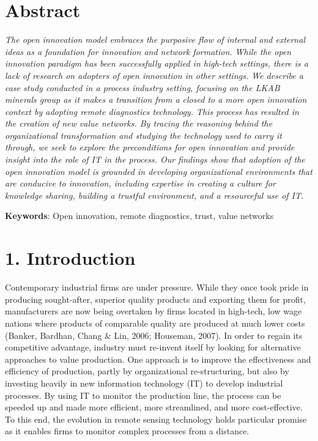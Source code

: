 \documentclass[]{article}
\begin{document}
\section*{\centering Abstract}

\emph{The open innovation model embraces the purposive flow of internal
and external ideas as a foundation for innovation and network formation.
While the open innovation paradigm has been successfully applied in
high-tech settings, there is a lack of research on adopters of open
innovation in other settings. We describe a case study conducted in a
process industry setting, focusing on the LKAB minerals group as it
makes a transition from a closed to a more open innovation context by
adopting remote diagnostics technology. This process has resulted in the
creation of new value networks. By tracing the reasoning behind the
organizational transformation and studying the technology used to carry
it through, we seek to explore the preconditions for open innovation and
provide insight into the role of IT in the process. Our findings show
that adoption of the open innovation model is grounded in developing
organizational environments that are conducive to innovation, including
expertise in creating a culture for knowledge sharing, building a
trustful environment, and a resourceful use of IT.}

\textbf{Keywords}: Open innovation, remote diagnostics, trust, value
networks

\section{1. Introduction}\label{introduction}

Contemporary industrial firms are under pressure. While they once took
pride in producing sought-after, superior quality products and exporting
them for profit, manufacturers are now being overtaken by firms located
in high-tech, low wage nations where products of comparable quality are
produced at much lower costs (Banker, Bardhan, Chang \& Lin, 2006;
Houseman, 2007). In order to regain its competitive advantage, industry
must re-invent itself by looking for alternative approaches to value
production. One approach is to improve the effectiveness and efficiency
of production, partly by organizational re-structuring, but also by
investing heavily in new information technology (IT) to develop
industrial processes. By using IT to monitor the production line, the
process can be speeded up and made more efficient, more streamlined, and
more cost-effective. To this end, the evolution in remote sensing
technology holds particular promise as it enables firms to monitor
complex processes from a distance.
\end{document}
